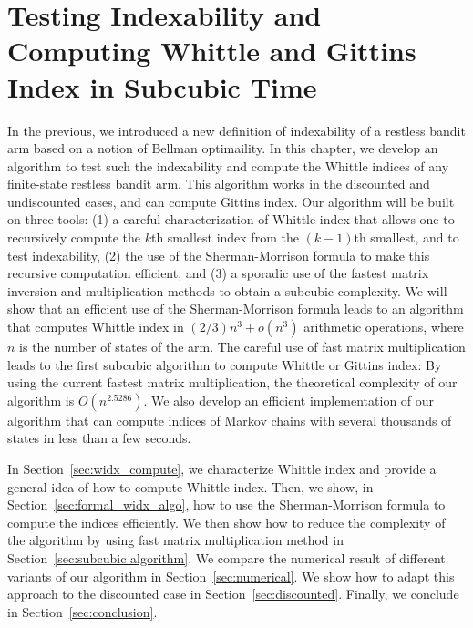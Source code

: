 \begingroup

\let\clearpage\relax

\chapter{Testing Indexability and Computing Whittle and Gittins Index in Subcubic Time}
\label{ch:index_computation}

In the previous, we introduced a new definition of indexability of a restless bandit arm based on a notion of Bellman optimaility.
In this chapter, we develop an algorithm to test such the indexability and compute the Whittle indices of any finite-state restless bandit arm.
This algorithm works in the discounted and undiscounted cases, and can compute Gittins index.
Our algorithm will be built on three tools: (1) a careful characterization of Whittle index that allows one to recursively compute the $k$th smallest index from the $(k-1)$th smallest, and to test indexability, (2) the use of the Sherman-Morrison formula to make this recursive computation efficient, and (3) a sporadic use of the fastest matrix inversion and multiplication methods to obtain a subcubic complexity.
We will show that an efficient use of the Sherman-Morrison formula leads to an algorithm that computes Whittle index in $(2/3)n^3 + o(n^3)$ arithmetic operations, where $n$ is the number of states of the arm. 
The careful use of fast matrix multiplication leads to the first subcubic algorithm to compute Whittle or Gittins index: By using the current fastest matrix multiplication, the theoretical complexity of our algorithm is $O(n^{2.5286})$.
We also develop an efficient implementation of our algorithm that can compute indices of Markov chains with several thousands of states in less than a few seconds.

In Section~\ref{sec:widx_compute}, we characterize Whittle index and provide a general idea of how to compute Whittle index. Then, we show, in Section~\ref{sec:formal_widx_algo}, how to use the Sherman-Morrison formula to compute the indices efficiently. We then show how to reduce the complexity of the algorithm by using fast matrix multiplication method in Section~\ref{sec:subcubic algorithm}. We compare the numerical result of different variants of our algorithm in Section~\ref{sec:numerical}. We show how to adapt this approach to the discounted case in Section~\ref{sec:discounted}.  Finally, we conclude in Section~\ref{sec:conclusion}.


